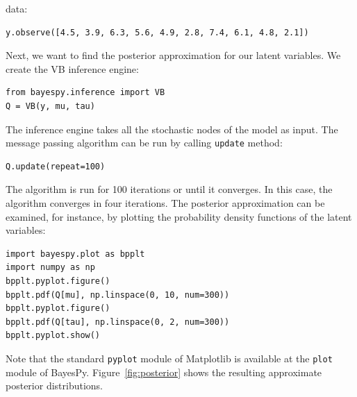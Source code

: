 \documentclass[twoside,11pt]{article}
\begin{document}
data:
\begin{lstlisting}
y.observe([4.5, 3.9, 6.3, 5.6, 4.9, 2.8, 7.4, 6.1, 4.8, 2.1])
\end{lstlisting}
Next, we want to find the posterior approximation for our latent variables.  We
create the VB inference engine:
\begin{lstlisting}
from bayespy.inference import VB
Q = VB(y, mu, tau)
\end{lstlisting}
The inference engine takes all the stochastic nodes of the model as input.  The
message passing algorithm can be run by calling \texttt{update} method:
\begin{lstlisting}
Q.update(repeat=100)
\end{lstlisting}
The algorithm is run for 100 iterations or until it converges.  In this case,
the algorithm converges in four iterations.  The posterior approximation can be
examined, for instance, by plotting the probability density functions of the
latent variables:
\begin{lstlisting}
import bayespy.plot as bpplt
import numpy as np
bpplt.pyplot.figure()
bpplt.pdf(Q[mu], np.linspace(0, 10, num=300))
bpplt.pyplot.figure()
bpplt.pdf(Q[tau], np.linspace(0, 2, num=300))
bpplt.pyplot.show()
\end{lstlisting}
Note that the standard \texttt{pyplot} module of Matplotlib is available at the
\texttt{plot} module of BayesPy.  Figure~\ref{fig:posterior} shows the resulting
approximate posterior distributions.
\end{document}
